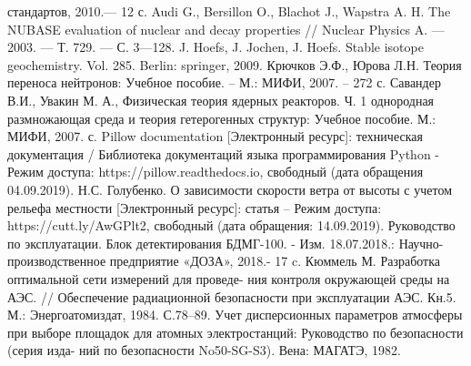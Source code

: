 \begin{thebibliography}{99}
		стандартов, 2010.— 12 с.
	 Audi G., Bersillon O., Blachot J., Wapstra A. H. The NUBASE evaluation of nuclear and decay properties 
		// Nuclear Physics A. — 2003. — Т. 729. — С. 3—128. 
	 J. Hoefs, J. Jochen, J. Hoefs. Stable isotope geochemistry. Vol. 285. Berlin: springer, 2009.
	 Крючков Э.Ф., Юрова Л.Н. Теория переноса нейтронов: Учебное пособие. – М.: МИФИ, 2007. – 272 с. 
	 Савандер В.И., Увакин М. А., Физическая теория ядерных реакторов. Ч. 1 однородная размножающая среда 
		и теория гетерогенных структур: Учебное пособие. М.: МИФИ, 2007. с.
	 Pillow documentation [Электронный ресурс]: техническая документация / Библиотека документаций языка программирования 
		Python - Режим доступа: https://pillow.readthedocs.io, свободный (дата обращения 04.09.2019).
	 Н.С. Голубенко. О зависимости скорости ветра от высоты с учетом рельефа местности [Электронный ресурс]: статья – 
		Режим доступа: https://cutt.ly/AwGPlt2, свободный (дата обращения: 14.09.2019).
	 Руководство по эксплуатации. Блок детектирования БДМГ-100. - Изм. 18.07.2018.: Научно-производственное предприятие 
		«ДОЗА», 2018.- 17 c.
	 Кюммель М. Разработка оптимальной сети измерений для проведе- ния контроля окружающей среды на АЭС. // 
		Обеспечение радиационной безопасности при эксплуатации АЭС. Кн.5. М.: Энергоатомиздат, 1984. С.78–89.
	 Учет дисперсионных параметров атмосферы при выборе площадок для атомных электростанций: Руководство по безопасности 
		(серия изда- ний по безопасности No50-SG-S3). Вена: МАГАТЭ, 1982.
\end{thebibliography}